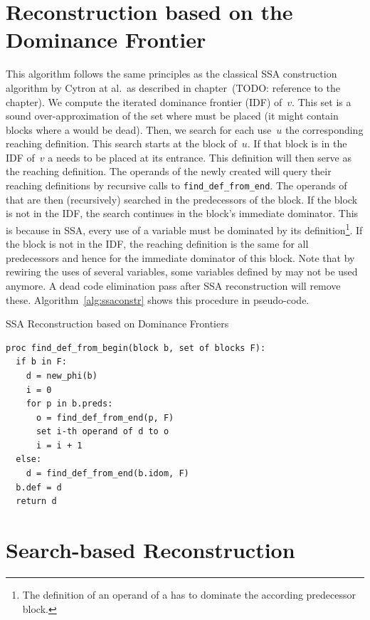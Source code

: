 \section{Reconstruction based on the Dominance Frontier}
This algorithm follows the same principles as the classical SSA construction algorithm by Cytron at al.~as described in chapter~(TODO: reference to the chapter).
We compute the iterated dominance frontier (IDF) of~$v$.
This set is a sound over-approximation of the set where \phifuns must be placed (it might contain blocks where a \phifun would be dead).
Then, we search for each use~$u$ the corresponding reaching definition.
This search starts at the block of~$u$.
If that block is in the IDF of~$v$ a \phifun needs to be placed at its entrance.
This definition will then serve as the reaching definition. 
The operands of the newly created \phifun will query their reaching definitions by recursive calls to \verb|find_def_from_end|.
The operands of that \phifun are then (recursively) searched in the predecessors of the block.
If the block is not in the IDF, the search continues in the block's immediate dominator. 
This is because in SSA, every use of a variable must be dominated by its definition\footnote{The definition of an operand of a \phifun has to dominate the according predecessor block.}.
If the block is not in the IDF, the reaching definition is the same for all predecessors and hence for the immediate dominator of this block.
Note that by rewiring the uses of several variables, some variables defined by \phifuns may not be used anymore.
A dead code elimination pass after SSA reconstruction will remove these. 
Algorithm~\ref{alg:ssaconstr} shows this procedure in pseudo-code.

\begin{algorithm}
  \caption{SSA Reconstruction based on Dominance Frontiers}
  \label{alg:ssaconstr}
\begin{verbatim}
proc find_def_from_begin(block b, set of blocks F):
  if b in F:
    d = new_phi(b)
    i = 0
    for p in b.preds: 
      o = find_def_from_end(p, F)
      set i-th operand of d to o
      i = i + 1
  else:
    d = find_def_from_end(b.idom, F)
  b.def = d
  return d
\end{verbatim}
\end{algorithm}

\section{Search-based Reconstruction}

